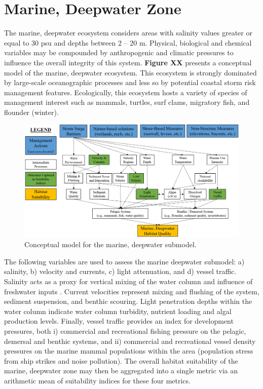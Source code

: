 \documentclass[
]{book}
\begin{document}
\hypertarget{marine-deepwater-zone}{%
\section{Marine, Deepwater Zone}\label{marine-deepwater-zone}}

The marine, deepwater ecosystem considers areas with salinity values greater or equal to 30 psu and depths between 2 -- 20 m. Physical, biological and chemical variables may be compounded by anthropogenic and climatic pressures to influence the overall integrity of this system. \textbf{Figure XX} presents a conceptual model of the marine, deepwater ecosystem. This ecosystem is strongly dominated by large-scale oceanographic processes and less so by potential coastal storm risk management features. Ecologically, this ecosystem hosts a variety of species of management interest such as mammals, turtles, surf clams, migratory fish, and flounder (winter).

\begin{figure}
\includegraphics[width=43.57in]{ZZ_Fig04.14_Mar.Deep_ConModel} \caption{Conceptual model for the marine, deepwater submodel.}\label{fig:unnamed-chunk-23}
\end{figure}

The following variables are used to assess the marine deepwater submodel: a) salinity, b) velocity and currents, c) light attenuation, and d) vessel traffic. Salinity acts as a proxy for vertical mixing of the water column and influence of freshwater inputs \citep{smit_assessing_2021}. Current velocities represent mixing and flushing of the system, sediment suspension, and benthic scouring. Light penetration depths within the water column indicate water column turbidity, nutrient loading and algal production levels. Finally, vessel traffic provides an index for development pressures, both i) commercial and recreational fishing pressure on the pelagic, demersal and benthic systems, and ii) commercial and recreational vessel density pressures on the marine mammal populations within the area (population stress from ship strikes and noise pollution). The overall habitat suitability of the marine, deepwater zone may then be aggregated into a single metric via an arithmetic mean of suitability indices for these four metrics.
\end{document}
